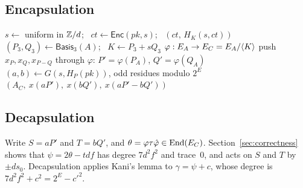 \subsection{Encapsulation}

\begin{algorithm}[h]
\caption[$\textsf{Encaps}(\mathit{pk})$ and the deterministic core $\textsf{Enc}(\mathit{pk},s)$]{$\textsf{Encaps}(\mathit{pk})$ and the deterministic core $\textsf{Enc}(\mathit{pk},s)$}\label{alg:encaps}
\begin{algorithmic}[1]
\State $s\gets$ uniform in $\mathbb{Z}/d$; \ $\mathit{ct}\gets\textsf{Enc}(\mathit{pk},s)$; \ \Return $(\mathit{ct},\,H_K(s,\mathit{ct}))$
\Statex
{}
  \State $(P_3,Q_3)\gets\textsf{Basis}_3(A)$; \ $K\gets P_3+sQ_3$ 
  \State $\varphi:E_A\to E_C=E_A/\langle K\rangle$ 
  \State push $x_P,x_Q,x_{P-Q}$ through $\varphi$: $P'=\varphi(P_A)$, $Q'=\varphi(Q_A)$
  \State $(a,b)\gets G(s,H_P(\mathit{pk}))$, odd residues modulo $2^E$
  \State \Return $(A_C,\ x(aP'),\ x(bQ'),\ x(aP'-bQ'))$
\EndFunction
\end{algorithmic}
\end{algorithm}

\subsection{Decapsulation}

Write $S=aP'$ and $T=bQ'$, and
$\theta=\varphi\tau\hat\varphi\in\operatorname{End}(E_C)$. Section~\ref{sec:correctness}
shows that $\psi=2\theta-tdf$ has degree $7d^2f^2$ and trace~0, and acts on
$S$ and $T$ by $\pm ds_0$. Decapsulation applies Kani's lemma to
$\gamma=\psi+c$, whose degree is $7d^2f^2+c^2=2^E-c'^2$.

